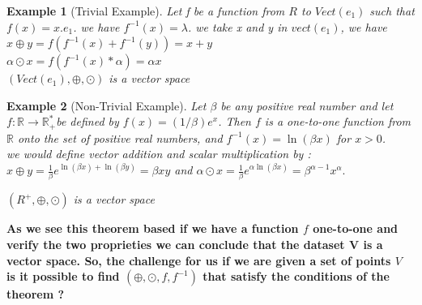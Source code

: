 \documentclass{article}
\newtheorem{Example}{Example}
\begin{document}
        \begin{Example}[Trivial Example]
            Let f be a function from $R$ to $Vect{(e_1)}$ such that $f(x) = x.e_1$.
            we have $f^{-1}(x) = \lambda$.
            we take x and y in $vect{(e_1)}$, we have \\
            $x\oplus y = f(f^{-1}(x) + f^{-1}(y)) = x + y$ \\
            $\alpha \odot x = f(f^{-1}(x) * \alpha) = \alpha x$ 
            \\
            $(Vect{(e_1)}, \oplus, \odot)$ is a vector space
        \end{Example}
        \begin{Example}[Non-Trivial Example]
            Let $\beta$ be any positive real number and let $f: \mathbb{R} \rightarrow \mathbb{R}_{+}^{*}$be
            defined by $f(x)=(1 / \beta) e^x$. Then $f$ is a one-to-one
            function from $\mathbb{R}$ onto the set of positive real numbers, 
            and $f^{-1}(x)=\ln (\beta x)$ for $x>0$. 
            \\
            we would define vector addition and scalar multiplication by :
            \\
            $
            x \oplus y=\frac{1}{\beta} e^{\ln (\beta x)+\ln (\beta y)}=\beta x y
            $
            and
            $
            \alpha \odot x=\frac{1}{\beta} e^{\alpha \ln (\beta x)}=\beta^{\alpha-1} x^\alpha.
            $

            $(R^+, \oplus, \odot)$ is a vector space 

        \end{Example}



        \textbf{As we see this theorem based if we have a function
        $f$ one-to-one and verify the two proprieties we can conclude that the dataset V is a vector space.
        So, the challenge for us if we are given a set of points $V$ is it  possible to 
        find $(\oplus,\odot,f,f^{-1})$ that satisfy the conditions of the theorem ?}
\end{document}
